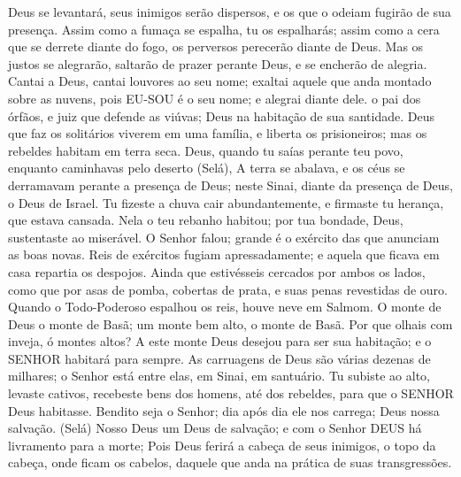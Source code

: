 
{\PP 
  Deus se levantará,
{} seus inimigos serão dispersos, e os que o odeiam fugirão de sua presença.
  Assim como a fumaça se espalha, tu os espalharás; assim como a cera que se derrete diante do fogo,
{} os perversos perecerão diante de Deus.
  Mas os justos se alegrarão,
{} saltarão de prazer perante Deus, e se encherão de alegria.
  Cantai a Deus, cantai louvores ao seu nome; exaltai aquele que anda montado sobre as nuvens, pois EU-SOU é o seu nome; e alegrai
{} diante dele.
   o pai dos órfãos, e juiz que defende as viúvas; Deus na habitação de sua santidade.
  Deus que faz os solitários viverem em uma família, e liberta os prisioneiros; mas os rebeldes habitam em terra seca.
  Deus, quando tu saías perante teu povo, enquanto caminhavas pelo deserto (Selá),
  A terra se abalava, e os céus se derramavam perante a presença de Deus; neste Sinai, diante da presença de Deus, o Deus de Israel.
  Tu fizeste a chuva cair abundantemente, e firmaste tu herança, que estava cansada.
  Nela o teu rebanho habitou; por tua bondade, Deus, sustentaste ao miserável.
  O Senhor falou; grande é o exército das que anunciam as boas novas.
  Reis de exércitos fugiam apressadamente;
 e aquela que ficava em casa repartia os despojos.
  Ainda que estivésseis cercados por ambos os lados,
{} como que por asas de pomba, cobertas de prata, e suas penas revestidas de ouro.
  Quando o Todo-Poderoso espalhou os reis, houve neve em Salmom.
  O monte de Deus
{} o monte de Basã;
{} um monte bem alto,
{} o monte de Basã.
  Por que olhais com inveja, ó montes altos? A este monte Deus desejou para ser sua habitação; e o SENHOR habitará
{} para sempre.
  As carruagens de Deus são várias dezenas de milhares; o Senhor está entre elas,
{} em Sinai, em
{} santuário.
  Tu subiste ao alto, levaste cativos, recebeste bens dos homens, até dos rebeldes, para que
{} o SENHOR Deus habitasse.
  Bendito seja o Senhor; dia após dia ele nos carrega; Deus
{} nossa salvação. (Selá)
  Nosso Deus
{} um Deus de salvação; e com o Senhor DEUS há livramento para a morte;
  Pois Deus ferirá a cabeça de seus inimigos, o topo da cabeça, onde ficam os cabelos, daquele que anda na prática de suas transgressões.
}
